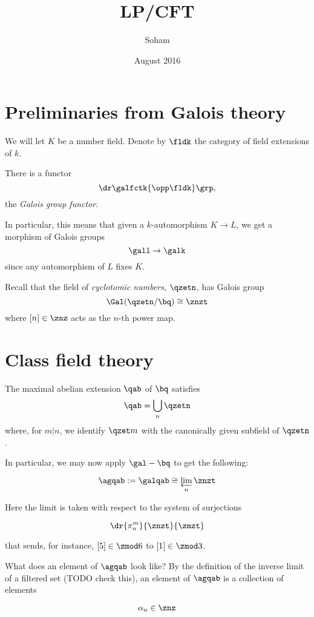 \documentclass{article}
\title{LP/CFT}
\author{Soham}
\date{August 2016}
\begin{document}
\maketitle

\section{Preliminaries from Galois theory}
We will let $K$ be a number field.
Denote by $\fldk$ the category of field extensions of $k$.

\begin{thm}
  There is a functor
  \[\dr \galfctk {\opp\fldk} \grp,\]
  the \textit{Galois group functor}.
\end{thm}

In particular, this means that given a $k$-automorphism $K\to L$, we get a
morphism of Galois groups
\[\gall \to \galk\]
since any automorphism of $L$ fixes $K$.

Recall that the field of \textit{cyclotomic numbers}, $\qzetn$, has Galois
group
\[\Gal(\qzetn/\bq) \cong \znzt \]
where $[n]\in\znz$ acts as the $n$-th power map.

\section{Class field theory}

\begin{thm}
  The maximal abelian extension $\qab$ of $\bq$ satisfies
  \[ \qab = \bigcup_n \qzetn \]
  where, for $m|n$, we identify $\qzet m$ with the canonically given subfield of
  $\qzetn$.
\end{thm}

In particular, we may now apply $\gal - \bq$ to get the following:

\[ \agqab := \galqab \cong \varprojlim_n \znzt \]

Here the limit is taken with respect to the system of surjections

\[ \dr {\pi_ n^m} {\znzt} {\zmzt} \]

that sends, for instance, $[5]\in{\zmod 6}$ to $[1]\in\zmod 3$.

What does an element of $\agqab$ look like? By the definition of the inverse
limit of a filtered set (TODO check this), an element of $\agqab$ is a collection of
elements

\[ \alpha_n \in \znz \]
\end{document}
